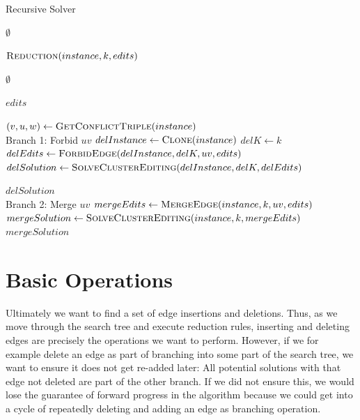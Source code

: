 \documentclass[12pt,oneside,english,parskip=full,headings=small]{scrbook}
\theoremstyle{definition}
\begin{document}
\begin{algorithm}[h]
\caption{Recursive Solver}
\label{alg:solver}
\begin{algorithmic}

		\State \Return $\emptyset$
	\EndIf

	\State $\Call{Reduction}{instance, k, edits}$

		\State \Return $\emptyset$
	\EndIf

		\State \Return $edits$
	\EndIf

	\State $(v, u, w) \gets \Call{GetConflictTriple}{instance}$
	\\
	\LineComment Branch 1: Forbid $uv$
	\State $delInstance \gets \Call{Clone}{instance}$
	\State $delK \gets k$
	\State $delEdits \gets \Call{ForbidEdge}{delInstance, delK, uv, edits}$
	\State $delSolution \gets \Call{SolveClusterEditing}{delInstance, delK, delEdits}$

		\State \Return $delSolution$
	\EndIf
	\\
	\LineComment Branch 2: Merge $uv$
	\State $mergeEdits \gets \Call{MergeEdge}{instance, k, uv, edits}$
	\State $mergeSolution \gets \Call{SolveClusterEditing}{instance, k, mergeEdits}$
	\State \Return $mergeSolution$
\EndFunction

\end{algorithmic}
\end{algorithm}

\section{Basic Operations}

Ultimately we want to find a set of edge insertions and deletions. Thus, as we move through the
search tree and execute reduction rules, inserting and deleting edges are precisely the operations
we want to perform. However, if we for example delete an edge as part of branching into
some part of the search tree, we want to ensure it does not get re-added later: All potential
solutions with that edge not deleted are part of the other branch. If we did not ensure this, we
would lose the guarantee of forward progress in the algorithm because we could get into a cycle of
repeatedly deleting and adding an edge as branching operation.
\end{document}
